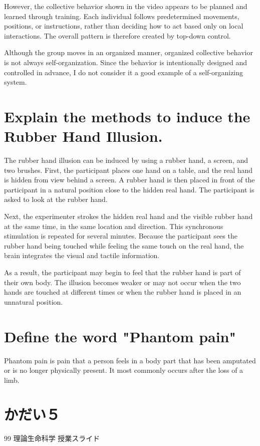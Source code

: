 \documentclass[titlepage,a4paper]{jsarticle}
\begin{document}
However, the collective behavior shown in the video appears to be planned and learned through training. 
Each individual follows predetermined movements, positions, or instructions, rather than deciding how to act based only on local interactions. 
The overall pattern is therefore created by top-down control.

Although the group moves in an organized manner, organized collective behavior is not always self-organization. 
Since the behavior is intentionally designed and controlled in advance, I do not consider it a good example of a self-organizing system.

\section{Explain the methods to induce the Rubber Hand Illusion.}
The rubber hand illusion can be induced by using a rubber hand, a screen, and two brushes. 
First, the participant places one hand on a table, and the real hand is hidden from view behind a screen. 
A rubber hand is then placed in front of the participant in a natural position close to the hidden real hand. The participant is asked to look at the rubber hand.

Next, the experimenter strokes the hidden real hand and the visible rubber hand at the same time, in the same location and direction. 
This synchronous stimulation is repeated for several minutes. 
Because the participant sees the rubber hand being touched while feeling the same touch on the real hand, the brain integrates the visual and tactile information.

As a result, the participant may begin to feel that the rubber hand is part of their own body. 
The illusion becomes weaker or may not occur when the two hands are touched at different times or when the rubber hand is placed in an unnatural position.
\section{Define the word "Phantom pain"}
Phantom pain is pain that a person feels in a body part that has been amputated or is no longer physically present. 
It most commonly occurs after the loss of a limb.

\section{かだい５}
\begin{thebibliography}{99}
理論生命科学 授業スライド
\end{thebibliography}
\end{document}
